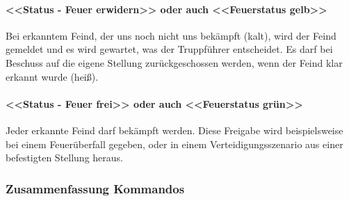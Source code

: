 \paragraph{<<Status - Feuer erwidern>>  oder auch <<Feuerstatus gelb>> }

	Bei erkanntem Feind, der uns noch nicht uns bekämpft (kalt), wird der Feind gemeldet und es wird gewartet, was der Truppführer entscheidet. Es darf bei Beschuss auf die eigene Stellung zurückgeschossen werden, wenn der Feind klar erkannt wurde (heiß). \\

\paragraph{<<Status - Feuer frei>> oder auch <<Feuerstatus grün>> }

	Jeder erkannte Feind darf bekämpft werden. Diese Freigabe wird beispielsweise bei einem Feuerüberfall gegeben, oder in einem Verteidigungsszenario aus einer befestigten Stellung heraus. \\
	
\subsubsection{Zusammenfassung Kommandos}

